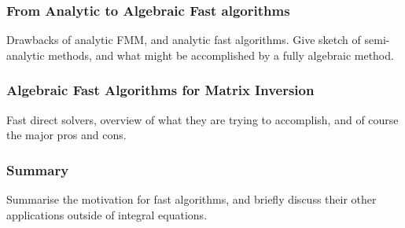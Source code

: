 \begin{frame}
    \frametitle{From Analytic to Algebraic Fast algorithms}
    Drawbacks of analytic FMM, and analytic fast algorithms. Give sketch of semi-analytic methods, and what might be accomplished by a fully algebraic method.
\end{frame}


\begin{frame}
    \frametitle{Algebraic Fast Algorithms for Matrix Inversion}
    Fast direct solvers, overview of what they are trying to accomplish, and of course the major pros and cons.
\end{frame}


\begin{frame}
    \frametitle{Summary}
    Summarise the motivation for fast algorithms, and briefly discuss their other applications outside of integral equations.
\end{frame}

